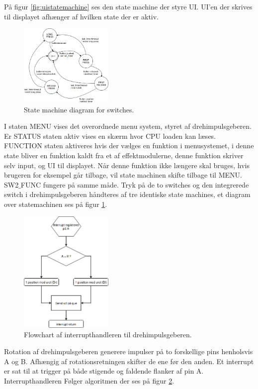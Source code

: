 På figur \ref{fig:uistatemachine} ses den state machine der styre UI.
UI'en der skrives til displayet afhænger af hvilken state der er aktiv.
\begin{figure}
	\centering 
	\includegraphics[width=0.4\textwidth]{billeder/buttons_statemachine.png} 
	\caption{State machine diagram for switches. } 
	\label{fig:SW_statemachine} 
\end{figure}
I staten MENU vises det overordnede menu system, styret af drehimpulsgeberen. 
Er STATUS staten aktiv vises en skærm hvor CPU loaden kan læses.
FUNCTION staten aktiveres hvis der vælges en funktion i menusystemet, i denne state bliver en funktion kaldt fra et af effektmodulerne, denne funktion skriver selv input, og  UI til displayet.
Når denne funktion ikke længere skal bruges, hvis brugeren for eksempel går tilbage, vil state machinen skifte tilbage til MENU.
SW2$\_$FUNC fungere på samme måde. \newline
Tryk på de to switches og den integrerede switch i drehimpulsgeberen håndteres af tre identiske state machines, et diagram over statemachinen ses på figur \ref{fig:SW_statemachine}.

\begin{figure} 
	\centering 
	\includegraphics[width=0.4\textwidth]{billeder/digi_interrupt_flow.png} 
	\caption{Flowchart af interrupthandleren til drehimpulsgeberen. } 
	\label{fig:digiFlow} 
\end{figure}
Rotation af drehimpulsgeberen generere impulser på to forskellige pins henholsvis A og B.
Afhængig af rotationsretningen skifter de ene før den anden. 
Et interrupt er sat til at trigger på både stigende og faldende flanker af pin A.
Interrupthandleren Følger algoritmen der ses på figur \ref{fig:digiFlow}.

